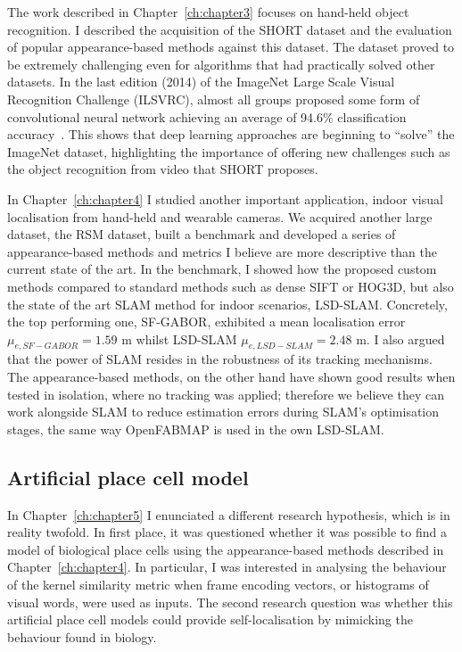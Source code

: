 The work described in Chapter~\ref{ch:chapter3} focuses on hand-held object recognition. I described the acquisition of the SHORT dataset and the evaluation of popular appearance-based methods a\-gainst this dataset. The dataset proved to be extremely challenging even for algorithms that had practically solved other datasets. In the last edition (2014) of the ImageNet Large Scale Visual Recognition Challenge (ILSVRC), almost all groups proposed some form of convolutional neural network achieving an average of 94.6\% classification accuracy~\cite{russakovsky2014imagenet}. This shows that deep learning approaches are beginning to ``solve'' the ImageNet dataset, highlighting the importance of offering new challenges such as the object recognition from video that SHORT proposes. 

In Chapter~\ref{ch:chapter4} I studied another important application, indoor visual localisation from hand-held and wearable cameras. We acquired another large dataset, the RSM dataset, built a benchmark and developed a series of appearance-based methods and metrics I believe are more descriptive than the current state of the art. In the benchmark, I showed how the proposed custom methods compared to standard methods such as dense SIFT or HOG3D, but also the state of the art SLAM method for indoor scenarios, LSD-SLAM. Concretely, the top performing one, SF-GABOR, exhibited a mean localisation error $\mu_{e,SF-GABOR} = 1.59 $ m whilst LSD-SLAM $\mu_{e,LSD-SLAM} = 2.48 $ m.  I also argued that the power of SLAM resides in the robustness of its tracking mechanisms. The appearance-based methods, on the other hand have shown good results when tested in isolation, where no tracking was applied; therefore we believe they can work alongside SLAM to reduce estimation errors during SLAM's optimisation stages, the same way OpenFABMAP is used in the own LSD-SLAM.


\subsection{Artificial place cell model}

In Chapter~\ref{ch:chapter5} I enunciated a different research hypothesis, which is in reality twofold. In first place, it was questioned whether it was possible to find  a model of biological place cells using the appearance-based methods described in Chapter~\ref{ch:chapter4}. In particular, I was interested in analysing the behaviour of the kernel similarity metric when frame encoding vectors, or histograms of visual words, were used as inputs. The second research question was whether this artificial place cell models could provide self-localisation by mimicking the behaviour found in biology.

